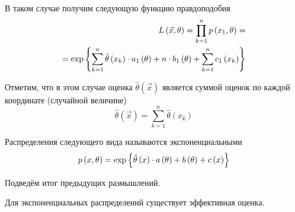 В таком случае получим следующую функцию правдоподобия
\begin{align*}
  L\left( \vec{x},\theta \right)
  =\prod_{k=1}^np\left(x_1,\theta\right)=\\
  =\exp{\left\{\sum_{k=1}^n \hat{\theta}\left(x_k\right)\cdot a_1\left(\theta\right)
    +n\cdot b_1\left( \theta \right)
    +\sum_{k=1}^n c_1\left( x_k \right)\right\}}
\end{align*}

Отметим, что в этом случае оценка $\hat{\theta}\left( \vec{x} \right)$
является суммой оценок по каждой координате (случайной величине)
$$\hat{\theta}\left(\vec{x}\right)=\sum_{k=1}^n \hat{\theta}\left(x_k\right)$$

\begin{definition}
  \label{def:exponentialDistribution}
  Распределения следующего вида называются экспоненциальными
  $$p\left(x,\theta\right)
    =\exp{\left\{\hat{\theta}\left(x\right)\cdot a\left(\theta\right)
      +b\left( \theta \right)+c\left( x \right)\right\}}$$
\end{definition}

Подведём итог предыдущих размышлений.

\begin{affirmation}
  \label{affirmation:efficientEstimator:exponentialExsistance}
  Для экспоненциальных распределений существует эффективная оценка.
\end{affirmation}

